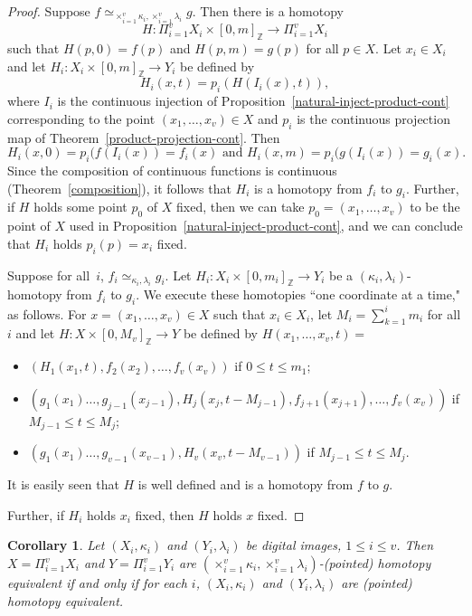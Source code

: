\documentclass{article}
\theoremstyle{plain}
\newtheorem{cor}[thm]{Corollary}
\theoremstyle{definition}
\numberwithin{thm}{section}
\def\Z{{\mathbb Z}}
\begin{document}
\begin{proof}
Suppose $f \simeq_{\times_{i=1}^v \kappa_i, \times_{i=1}^v \lambda_i} g$. Then 
there is a homotopy
\[ H: \Pi_{i=1}^v X_i \times [0,m]_{\Z} \to \Pi_{i=1}^v X_i \]
such that $H(p,0)=f(p)$ and
$H(p,m)=g(p)$ for all $p \in X$.
Let $x_i \in X_i$ and let $H_i: X_i \times [0,m]_{\Z} \to Y_i$ be defined by
\[ H_i(x,t) = p_i(H(I_i(x),t)),
\]
where $I_i$ is the continuous injection of Proposition~\ref{natural-inject-product-cont} corresponding to the point $(x_1,\ldots,x_v)\in X$ and $p_i$ is the continuous
projection map of Theorem~\ref{product-projection-cont}. Then
\[ H_i(x,0)=p_i(f(I_i(x))=f_i(x) \mbox{ and } H_i(x,m)=p_i(g(I_i(x))=g_i(x).
\]
Since the composition of continuous functions is continuous (Theorem~\ref{composition}), it follows that
$H_i$ is a homotopy from $f_i$ to $g_i$.
Further, if $H$ holds some point $p_0$ of $X$ fixed, then we can take $p_0=(x_1,\ldots,x_v)$ to be
the point of $X$ used in Proposition~\ref{natural-inject-product-cont},
and we can conclude that $H_i$ holds $p_i(p)=x_i$ fixed.

Suppose for all~$i$, $f_i \simeq_{\kappa_i,\lambda_i} g_i$. Let
$H_i: X_i \times [0,m_i]_{\Z} \to Y_i$ be a $(\kappa_i,\lambda_i)$-homotopy
from $f_i$ to $g_i$. We execute these homotopies ``one coordinate at a time," as
follows. For $x=(x_1,\ldots, x_v) \in X$ such that
$x_i \in X_i$, let $M_i = \sum_{k=1}^i m_i$ for all $i$ and let
$H: X \times [0, M_v]_{\Z} \to Y$ be defined by $H(x_1,\ldots,x_v,t) =$
\begin{itemize}
\item $(H_1(x_1,t),f_2(x_2), \ldots, f_v(x_v))$ if $0 \le t \le m_1$;
\item $(g_1(x_1) \ldots, g_{j-1}(x_{j-1}), H_j(x_j,t-M_{j-1}), f_{j+1}(x_{j+1}),
      \ldots, f_v(x_v))$ if $M_{j-1} \le t \le M_j$;
\item $(g_1(x_1) \ldots, g_{v-1}(x_{v-1}), H_v(x_v,t-M_{v-1}))$ if
      $M_{j-1} \le t \le M_j$.
\end{itemize}
It is easily seen that $H$ is well defined and is a homotopy from $f$ to $g$.

Further, if $H_i$ holds $x_i$ fixed, then $H$ holds $x$ fixed.
\end{proof}

\begin{cor}
\label{product-adj-ptd-htpy-equiv}
Let $(X_i,\kappa_i)$ and $(Y_i,\lambda_i)$
be digital images, $1 \le i \le v$.
Then $X=\Pi_{i=1}^v X_i$ and $Y=\Pi_{i=1}^v Y_i$ are $(\times_{i=1}^v \kappa_i, \times_{i=1}^v \lambda_i)$-(pointed) homotopy equivalent if and only if
for each $i$, $(X_i,\kappa_i)$ and $(Y_i,\lambda_i)$ are
(pointed) homotopy equivalent.
\end{cor}
\end{document}
